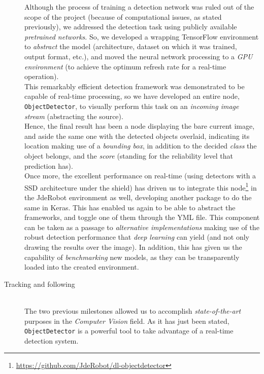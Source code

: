 \begin{description}
			Although the process of training a detection network was ruled out of the scope of the project (because of computational issues, as stated previously), we addressed the detection task using publicly available \emph{pretrained networks}. So, we developed a wrapping TensorFlow environment to \emph{abstract} the model (architecture, dataset on which it was trained, output format, etc.), and moved the neural network processing to a \emph{GPU environment} (to achieve the optimum refresh rate for a real-time operation).\\
			
			This remarkably efficient detection framework was demonstrated to be capable of real-time processing, so we have developed an entire node, \texttt{ObjectDetector}, to visually perform this task on an \emph{incoming image stream} (abstracting the source).\\
			
			Hence, the final result  has been a node displaying the bare current image, and aside the same one with the detected objects overlaid, indicating its location making use of a \emph{bounding box}, in addition to the decided \emph{class} the object belongs, and the \emph{score} (standing for the reliability level that prediction has).\\
			
			Once more, the excellent performance on real-time (using detectors with a SSD architecture under the shield) has driven us to integrate this node\footnote{\url{https://github.com/JdeRobot/dl-objectdetector}} in the JdeRobot environment as well, developing another package to do the same in Keras. This has enabled us again to be able to abstract the frameworks, and toggle one of them through the YML file. This component can be taken as a passage to \emph{alternative implementations} making use of the robust detection performance that \emph{deep learning} can yield (and not only drawing the results over the image). In addition, this has given us the capability of \emph{benchmarking} new models, as they can be transparently loaded into the created environment.
		
		\item[Tracking and following] \hfill
			\vspace{0.2in} \\
			The two previous milestones allowed us to accomplish \emph{state-of-the-art} purposes in the \emph{Computer Vision} field. As it has just been stated, \texttt{ObjectDetector} is a powerful tool to take advantage of a real-time detection system.\\
			

\end{description}
